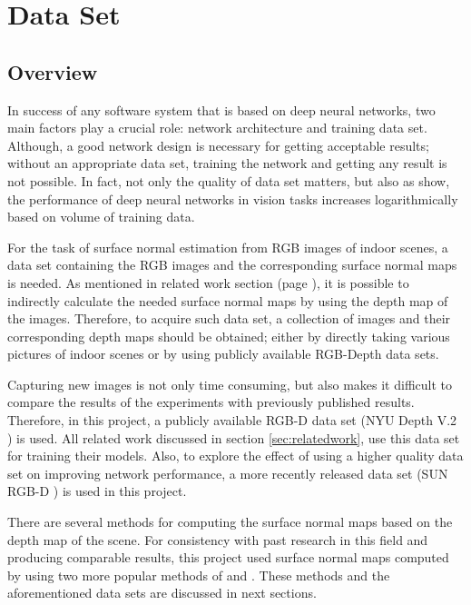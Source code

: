 \chapter{Data Set}
\label{Dataset}

\section{Overview}

In success of any software system that is based on deep neural networks, two main factors play a crucial role: network architecture and training data set. Although, a good network design is necessary for getting acceptable results; without an appropriate data set, training the network and getting any result is not possible. In fact, not only the quality of data set matters, but also as \citeauthor*{data} \cite{data} show, the performance of deep neural networks in vision tasks increases logarithmically based on volume of training data. 

For the task of surface normal estimation from RGB images of indoor scenes, a data set containing the RGB images and the corresponding surface normal maps is needed. As mentioned in related work section (page \pageref{sec:relatedwork}), it is possible to indirectly calculate the needed surface normal maps by using the depth map of the images. Therefore, to acquire such data set, a collection of images and their corresponding depth maps should be obtained; either by directly taking various pictures of indoor scenes or by using publicly available RGB-Depth data sets. 

Capturing new images is not only time consuming, but also makes it difficult to compare the results of the experiments with previously published results. Therefore, in this project, a publicly available RGB-D data set (NYU Depth V.2 \cite{silberman}) is used. All related work discussed in section \ref{sec:relatedwork}, use this data set for training their models. Also, to explore the effect of using a higher quality data set on improving network performance, a more recently released data set (SUN RGB-D \cite{sun}) is used in this project. 

There are several methods for computing the surface normal maps based on the depth map of the scene. For consistency with past research in this field and producing comparable results, this project used surface normal maps computed by using two more popular methods of \citeauthor*{ladicky} \cite{ladicky} and \citeauthor*{silberman} \cite{silberman}. These methods and the aforementioned data sets are discussed in next sections. 

